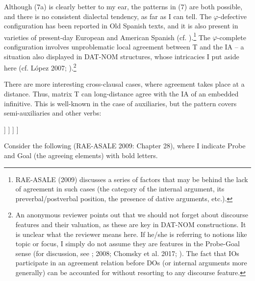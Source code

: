 \documentclass[output=paper]{langsci/langscibook}
\begin{document}
Although (7a) is clearly better to my ear, the patterns in (7) are both possible, and there is no consistent dialectal tendency, as far as I can tell. The $\varphi $-defective configuration has been reported in Old Spanish texts, and it is also present in varieties of present-day European and American Spanish (cf. \citealt{Mendikoetxea1999}).\footnote{RAE-ASALE (2009) discusses a series of factors that may be behind the lack of agreement in such cases (the category of the internal argument, its preverbal/postverbal position, the presence of dative arguments, etc.).} The $\varphi $-complete configuration involves unproblematic local agreement between T and the IA – a situation also displayed in DAT-NOM structures, whose intricacies I put aside here (cf. López 2007; \citealt{Chomsky2008}).\footnote{An anonymous reviewer points out that we should not forget about discourse features and their valuation, as these are key in DAT-NOM constructions. It is unclear what the reviewer means here. If he/she is referring to notions like topic or focus, I simply do not assume they are features in the Probe-Goal sense (for discussion, see \citealt{Chomsky2001}; 2008; Chomsky et al. 2017; \citealt{Ott2016}). The fact that IOs participate in an agreement relation before DOs (or internal arguments more generally)  can be accounted for without resorting to any discourse feature.} 

There are more interesting cross-clausal cases, where agreement takes place at a distance. Thus, matrix T can long-distance agree with the IA of an embedded infinitive. This is well-known in the case of auxiliaries, but the pattern covers semi-auxiliaries and other verbs: 

\ea%
\settowidth\jamwidth{[SEMIAUX = try, need, etc.]}
    \label{ex:gallego:8}
    \ea\relax [ T [ SE  V\textsubscript{AUX}         [ INF XP ] ] ]      \jambox{[AUX = can, should, etc.]}
    \ex\relax [ T [ SE  V\textsubscript{SEMIAUX}  [ INF XP ] ] ]         \jambox{[SEMIAUX = try, need, etc.]}
    \z
\z    

  

Consider the following (RAE-ASALE 2009: Chapter 28), where I indicate Probe and Goal (the agreeing elements) with bold letters.
\end{document}
